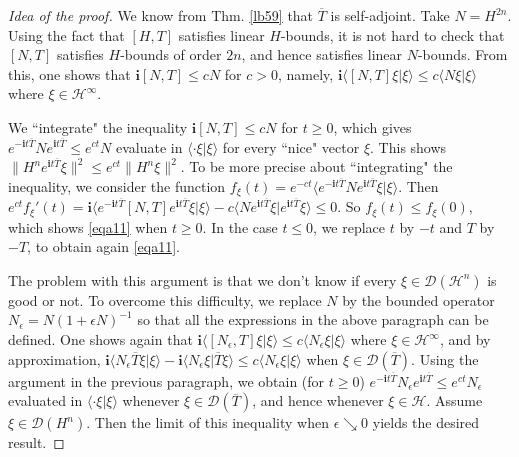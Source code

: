 \documentclass[12pt,b5paper,notitlepage]{article}
\theoremstyle{definition}
\theoremstyle{plain}
\newcommand{\mc}{\mathcal}
\newcommand{\ovl}{\overline}
\newcommand{\Dom}{\scr{D}}
\newcommand{\bk}[1]{\langle {#1}\rangle}
\newcommand{\scr}{\mathscr}
\newcommand{\im}{\mathbf{i}}
\numberwithin{equation}{section}
\begin{document}
\begin{proof}[Idea of the proof]
We know from Thm. \ref{lb59} that $\ovl T$ is self-adjoint. Take $N=H^{2n}$. Using the fact that $[H,T]$ satisfies linear $H$-bounds, it is not hard to check that $[N,T]$ satisfies $H$-bounds of order $2n$, and hence satisfies linear $N$-bounds. From this, one shows that $\im[N,T]\leq cN$ for $c>0$, namely, $\im\bk{[N,T]\xi|\xi}\leq c\bk{N\xi|\xi}$ where $\xi\in\mc H^\infty$.

We ``integrate" the inequality $\im[N,T]\leq cN$ for $t\geq 0$, which gives $e^{-\im t\ovl T}Ne^{\im t\ovl T}\leq e^{ct}N$ evaluate in $\bk{\cdot \xi|\xi}$ for every ``nice" vector $\xi$. This shows $\lVert H^ne^{\im t\ovl T}\xi\lVert^2\leq e^{ct}\lVert H^n\xi\lVert^2$. To be more precise about ``integrating" the inequality, we consider the function $f_\xi(t)=e^{-ct}\bk{e^{-\im t\ovl T}Ne^{\im t\ovl T}\xi|\xi}$. Then $e^{ct}f_\xi'(t)=\im\bk{e^{-\im t\ovl T}[N,T]e^{\im t\ovl T}\xi|\xi}- c\bk{Ne^{\im t\ovl T}\xi|e^{\im t\ovl T}\xi}\leq 0$. So $f_\xi(t)\leq f_\xi(0)$, which shows \eqref{eqa11} when $t\geq 0$. In the case $t\leq 0$, we replace $t$ by $-t$ and $T$ by $-T$, to obtain again \eqref{eqa11}.

The problem with this argument is that we don't know if every $\xi\in\Dom(\mc H^n)$ is good or not. To overcome this difficulty, we replace $N$ by the bounded operator $N_\epsilon=N(1+\epsilon N)^{-1}$ so that all the expressions in the above paragraph can be defined. One shows again that $\im\bk{[N_\epsilon,T]\xi|\xi}\leq c\bk{N_\epsilon\xi|\xi}$ where $\xi\in\mc H^\infty$, and by approximation, $\im\bk{N_\epsilon \ovl T\xi|\xi}-\im\bk{N_\epsilon\xi|\ovl T\xi}\leq c\bk{N_\epsilon\xi|\xi}$ when $\xi\in\Dom(\ovl T)$. Using the argument in the previous paragraph, we obtain (for $t\geq 0$) $e^{-\im t\ovl T}N_\epsilon e^{\im t\ovl T}\leq e^{ct}N_\epsilon$  evaluated in $\bk{\cdot \xi|\xi}$ whenever $\xi\in\Dom(\ovl T)$, and hence whenever $\xi\in\mc H$. Assume $\xi\in\Dom(H^n)$.  Then the limit of this inequality when $\epsilon\searrow0$ yields the desired result.
\end{proof}
\end{document}
